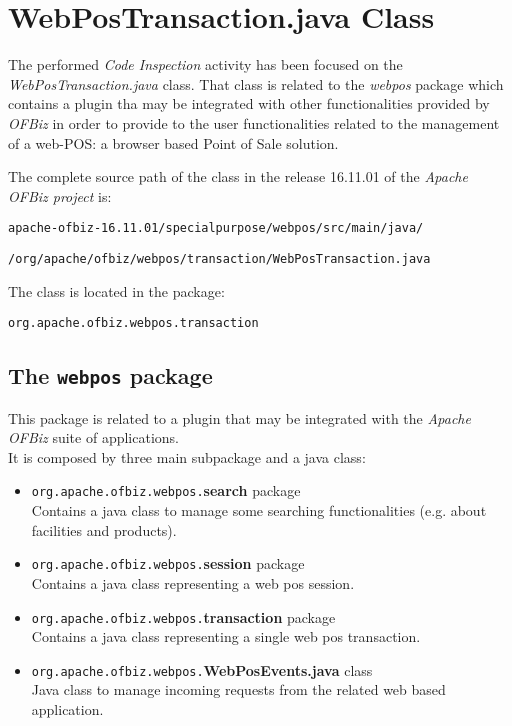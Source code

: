 \section{WebPosTransaction.java Class}
The performed \emph{Code Inspection} activity has been focused on the \emph{WebPosTransaction.java} class. That class is related to the \emph{webpos} package which contains a plugin tha may be integrated with other functionalities provided by \textit{OFBiz} in order to provide to the user functionalities related to the management of a web-POS: a browser based Point of Sale solution.

The complete source path of the class in the release 16.11.01 of the \emph{Apache OFBiz project} is:\\

\centerline{\tt apache-ofbiz-16.11.01/specialpurpose/webpos/src/main/java/}
\centerline{\tt /org/apache/ofbiz/webpos/transaction/WebPosTransaction.java} \hfill

The class is located in the package:\\
\centerline{\tt org.apache.ofbiz.webpos.transaction}

\subsection{The \texttt{webpos} package}
This package is related to a plugin that may be integrated with the \emph{Apache OFBiz} suite of applications.\\
It is composed by three main subpackage and a java class:
\begin{itemize}
	\item \texttt{org.apache.ofbiz.webpos.}\textbf{search} package\\Contains a java class to manage some searching functionalities (e.g. about facilities and products).
	\item \texttt{org.apache.ofbiz.webpos.}\textbf{session} package\\Contains a java class representing a web pos session.
	\item \texttt{org.apache.ofbiz.webpos.}\textbf{transaction} package\\Contains a java class representing  a single web pos transaction.
	\item \texttt{org.apache.ofbiz.webpos.}\textbf{WebPosEvents.java} class\\Java class to manage incoming requests from the related web based application.
\end{itemize}

